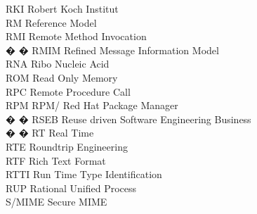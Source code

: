 \begin{tabbing}
    \>RKI \>\>Robert Koch Institut\\

    \>RM \>\>Reference Model\\

    \>RMI \>\>Remote Method Invocation\\

� � \>RMIM \>\>Refined Message Information Model\\

    \>RNA \>\>Ribo Nucleic Acid\\


    \>ROM \>\>Read Only Memory\\

    \>RPC \>\>Remote Procedure Call\\

    \>RPM \>\>RPM/ Red Hat Package Manager\\

� � \>RSEB \>\>Reuse driven Software Engineering Business\\



� � \>RT \>\>Real Time\\


    \>RTE \>\>Roundtrip Engineering\\

    \>RTF \>\>Rich Text Format\\


    \>RTTI \>\>Run Time Type Identification\\


    \>RUP \>\>Rational Unified Process\\


    \>S/MIME \>\>Secure MIME\\


\end{tabbing}
